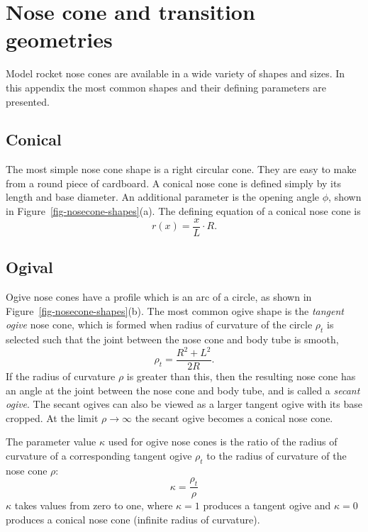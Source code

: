 

\chapter{Nose cone and transition geometries}
\label{app-nosecone-geometry}

Model rocket nose cones are available in a wide variety of shapes and
sizes.  In this appendix the most common shapes and their defining
parameters are presented.


\section{Conical}

The most simple nose cone shape is a right circular cone.  They are
easy to make from a round piece of cardboard.  A conical nose cone is
defined simply by its length and base diameter. An additional
parameter is the opening angle $\phi$, shown in
Figure~\ref{fig-nosecone-shapes}(a).  The defining equation of a
conical nose cone is
%
\begin{equation}
r(x) = \frac{x}{L}\cdot R.
\end{equation}


\section{Ogival}

Ogive nose cones have a profile which is an arc of a circle, as shown
in Figure~\ref{fig-nosecone-shapes}(b).  The most common ogive shape
is the {\it tangent ogive} nose cone, which is formed when radius of
curvature of the circle $\rho_t$ is selected such that the joint
between the nose cone and body tube is smooth,
%
\begin{equation}
\rho_t = \frac{R^2+L^2}{2R}.
\end{equation}
%
If the radius of curvature $\rho$ is greater than this, then the
resulting nose cone has an angle at the joint between the nose cone
and body tube, and is called a {\it secant ogive}.  The secant ogives
can also be viewed as a larger tangent ogive with its base cropped.
At the limit $\rho\rightarrow\infty$ the secant ogive becomes a
conical nose cone.

The parameter value $\kappa$ used for ogive nose cones is the ratio of
the radius of curvature of a corresponding tangent ogive $\rho_t$ to
the radius of curvature of the nose cone $\rho$:
%
\begin{equation}
\kappa = \frac{\rho_t}{\rho}
\end{equation}
%
$\kappa$ takes values from zero to one, where $\kappa=1$ produces a
tangent ogive and $\kappa=0$ produces a conical nose cone (infinite
radius of curvature).

